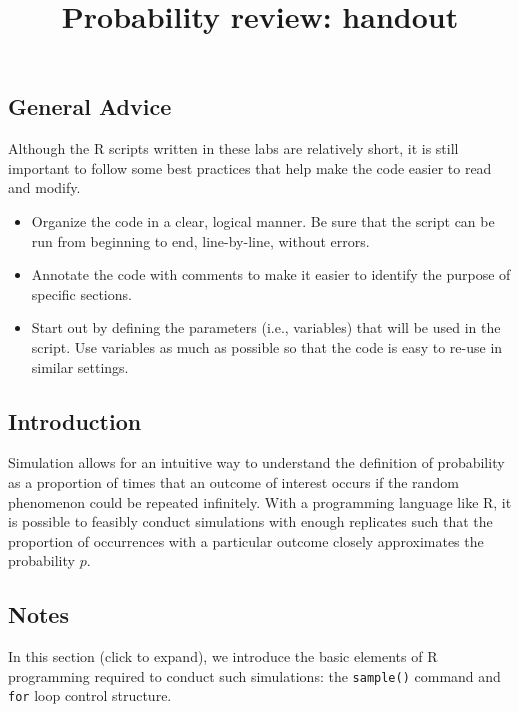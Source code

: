 \documentclass[
]{article}
\title{Probability review: handout}
\author{}
\date{\vspace{-2.5em}}
\begin{document}
\maketitle

\hypertarget{general-advice}{%
\subsection{General Advice}\label{general-advice}}

Although the R scripts written in these labs are relatively short, it is
still important to follow some best practices that help make the code
easier to read and modify.

\begin{itemize}
\item
  Organize the code in a clear, logical manner. Be sure that the script
  can be run from beginning to end, line-by-line, without errors.
\item
  Annotate the code with comments to make it easier to identify the
  purpose of specific sections.
\item
  Start out by defining the parameters (i.e., variables) that will be
  used in the script. Use variables as much as possible so that the code
  is easy to re-use in similar settings.
\end{itemize}

\hypertarget{introduction}{%
\subsection{Introduction}\label{introduction}}

Simulation allows for an intuitive way to understand the definition of
probability as a proportion of times that an outcome of interest occurs
if the random phenomenon could be repeated infinitely. With a
programming language like R, it is possible to feasibly conduct
simulations with enough replicates such that the proportion of
occurrences with a particular outcome closely approximates the
probability \(p\).

\hypertarget{notes}{%
\subsection{Notes}\label{notes}}

In this section (click to expand), we introduce the basic elements of R
programming required to conduct such simulations: the \texttt{sample()}
command and \texttt{for} loop control structure.
\end{document}
